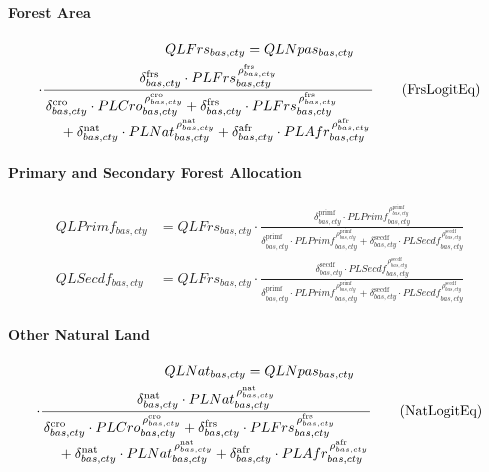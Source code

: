 \paragraph{Forest Area}
\begin{multline}
  QLFrs_{bas,cty} = QLNpas_{bas,cty}\\
  \cdot
  \frac{
    \delta^{\text{frs}}_{bas,cty} \cdot PLFrs_{bas,cty}^{\,\rho^{\text{frs}}_{bas,cty}}
  }{
    \splitfrac{\delta^{\text{cro}}_{bas,cty} \cdot PLCro_{bas,cty}^{\,\rho^{\text{cro}}_{bas,cty}}
    + \delta^{\text{frs}}_{bas,cty} \cdot PLFrs_{bas,cty}^{\,\rho^{\text{frs}}_{bas,cty}}}
    {+ \delta^{\text{nat}}_{bas,cty} \cdot PLNat_{bas,cty}^{\,\rho^{\text{nat}}_{bas,cty}}
    + \delta^{\text{afr}}_{bas,cty} \cdot PLAfr_{bas,cty}^{\,\rho^{\text{afr}}_{bas,cty}}}
  }
  \tag{FrsLogitEq}\label{eq:FrsLogitEq}
\end{multline}

\paragraph{Primary and Secondary Forest Allocation}
\begin{align}
  QLPrimf_{bas,cty}
  &= QLFrs_{bas,cty}
     \cdot
     \frac{
       \delta^{\text{primf}}_{bas,cty}\cdot PLPrimf_{bas,cty}^{\,\rho^{\text{primf}}_{bas,cty}}
     }{
       \delta^{\text{primf}}_{bas,cty}\cdot PLPrimf_{bas,cty}^{\,\rho^{\text{primf}}_{bas,cty}}
       +
       \delta^{\text{secdf}}_{bas,cty}\cdot PLSecdf_{bas,cty}^{\,\rho^{\text{secdf}}_{bas,cty}}
     }
  \tag{PrimfLogitEq}\label{eq:PrimfLogitEq}\\[0.4em]
  QLSecdf_{bas,cty}
  &= QLFrs_{bas,cty}
     \cdot
     \frac{
       \delta^{\text{secdf}}_{bas,cty}\cdot PLSecdf_{bas,cty}^{\,\rho^{\text{secdf}}_{bas,cty}}
     }{
       \delta^{\text{primf}}_{bas,cty}\cdot PLPrimf_{bas,cty}^{\,\rho^{\text{primf}}_{bas,cty}}
       +
       \delta^{\text{secdf}}_{bas,cty}\cdot PLSecdf_{bas,cty}^{\,\rho^{\text{secdf}}_{bas,cty}}
     }
  \tag{SecdfLogitEq}\label{eq:SecdfLogitEq}
\end{align}

\paragraph{Other Natural Land}
\begin{multline}
  QLNat_{bas,cty} = QLNpas_{bas,cty}\\
  \cdot
  \frac{
    \delta^{\text{nat}}_{bas,cty} \cdot PLNat_{bas,cty}^{\,\rho^{\text{nat}}_{bas,cty}}
  }{
    \splitfrac{\delta^{\text{cro}}_{bas,cty} \cdot PLCro_{bas,cty}^{\,\rho^{\text{cro}}_{bas,cty}}
    + \delta^{\text{frs}}_{bas,cty} \cdot PLFrs_{bas,cty}^{\,\rho^{\text{frs}}_{bas,cty}}}
    {+ \delta^{\text{nat}}_{bas,cty} \cdot PLNat_{bas,cty}^{\,\rho^{\text{nat}}_{bas,cty}}
    + \delta^{\text{afr}}_{bas,cty} \cdot PLAfr_{bas,cty}^{\,\rho^{\text{afr}}_{bas,cty}}}
  }
  \tag{NatLogitEq}\label{eq:NatLogitEq}
\end{multline}

